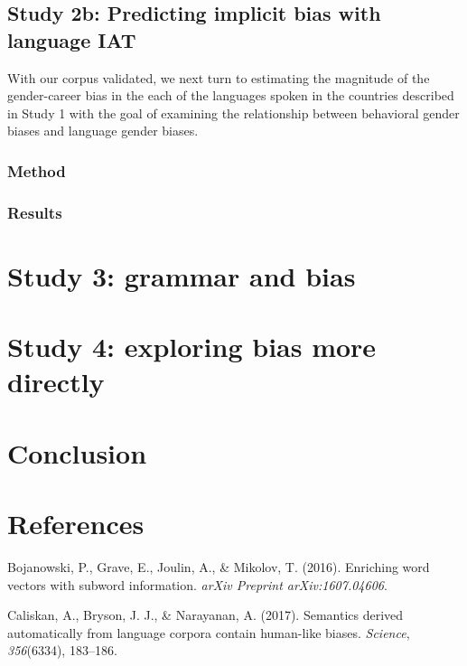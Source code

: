 \documentclass[10pt, letterpaper]{article}
\begin{document}
\subsection{Study 2b: Predicting implicit bias with language
IAT}\label{study-2b-predicting-implicit-bias-with-language-iat}

With our corpus validated, we next turn to estimating the magnitude of
the gender-career bias in the each of the languages spoken in the
countries described in Study 1 with the goal of examining the
relationship between behavioral gender biases and language gender
biases.

\subsubsection{Method}\label{method-2}

\subsubsection{Results}\label{results-2}

\section{Study 3: grammar and bias}\label{study-3-grammar-and-bias}

\section{Study 4: exploring bias more
directly}\label{study-4-exploring-bias-more-directly}

\section{Conclusion}\label{conclusion}

\section{References}\label{references}

\setlength{\parindent}{-0.1in} \setlength{\leftskip}{0.125in} \noindent

\hypertarget{refs}{}
\hypertarget{ref-bojanowski2016enriching}{}
Bojanowski, P., Grave, E., Joulin, A., \& Mikolov, T. (2016). Enriching
word vectors with subword information. \emph{arXiv Preprint
arXiv:1607.04606}.

\hypertarget{ref-caliskan2017semantics}{}
Caliskan, A., Bryson, J. J., \& Narayanan, A. (2017). Semantics derived
automatically from language corpora contain human-like biases.
\emph{Science}, \emph{356}(6334), 183--186.
\end{document}
